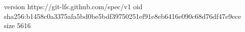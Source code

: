 version https://git-lfs.github.com/spec/v1
oid sha256:b1458c0a3375afa5bd0be5bdf39750251ef91e8eb6416e090c68d76df47e9ece
size 5616
